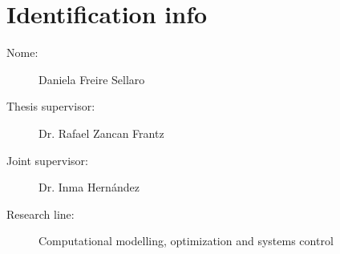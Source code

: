 \section{Identification info}
\label{sec:identification}

\begin{description} 
\item [Nome:] Daniela Freire Sellaro
\item [Thesis supervisor:] Dr. Rafael Zancan Frantz
\item [Joint supervisor:] Dr. Inma Hernández 
\item [Research line:] Computational modelling, optimization and systems control
\end{description}